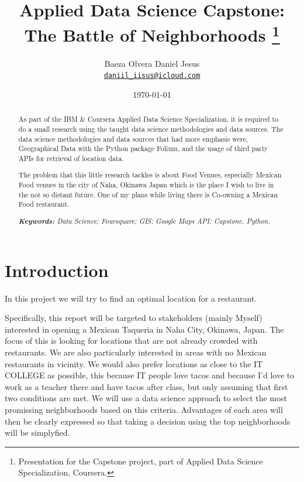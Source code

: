 \documentclass[11pt]{article}
\title{Applied Data Science Capstone: The Battle of Neighborhoods
\thanks{Presentation for the Capstone project, part of Applied Data Science Specialization, Coursera.}
}
\author{Baeza Olvera Daniel Jesus\\%
    \href{mailto:daniil_iisus@icloud.com}{\texttt{daniil_iisus@icloud.com}} %
    }
\date{\today}
\begin{document}
{

\begin{abstract}
As part of the IBM \& Coursera Applied Data Science Specialization, it is required to do a small research using the taught data science methodologies and data sources.
The data science methodologies and data sources that had more emphasis were, Geographical Data with the Python package Folium, and the usage of third party APIs for retrieval of location data.
\newline

The problem that this little research tackles is about Food Venues, especially Mexican Food venues in the city of Naha, Okinawa Japan which is the place I wish to live in the not so distant future. One of my plans while living there is Co-owning a Mexican Food restaurant.
\newline

\noindent
\textit{\textbf{Keywords: }%
Data Science; Foursquare; GIS; Google Maps API; Capstone, Python.} \\ %
\end{abstract}
}


\section{Introduction}

In this project we will try to find an optimal location for a restaurant.
\newline

Specifically, this report will be targeted to stakeholders (mainly Myself) interested in opening a Mexican Taqueria in Naha City, Okinawa, Japan. The focus of this is looking for locations that are not already crowded with restaurants. We are also particularly interested in areas with no Mexican restaurants in vicinity. We would also prefer locations as close to the IT COLLEGE as possible, this because IT people love tacos and because I'd love to work as a teacher there and have tacos after class, but only assuming that first two conditions are met. We will use a data science approach to select the most promissing neighborhoods based on this criteria. Advantages of each area will then be clearly expressed so that taking a decision using the top neighborhoods will be simplyfied.
\newline
\end{document}
